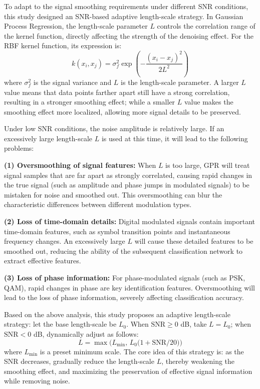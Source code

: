 \documentclass[conference]{IEEEtran}
\begin{document}
To adapt to the signal smoothing requirements under different SNR conditions, this study designed an SNR-based adaptive length-scale strategy. In Gaussian Process Regression, the length-scale parameter $L$ controls the correlation range of the kernel function, directly affecting the strength of the denoising effect. For the RBF kernel function, its expression is:
\begin{equation}
k(x_i, x_j) = \sigma_f^2 \exp\left(-\frac{(x_i - x_j)^2}{2L^2}\right)
\end{equation}
where $\sigma_f^2$ is the signal variance and $L$ is the length-scale parameter. A larger $L$ value means that data points farther apart still have a strong correlation, resulting in a stronger smoothing effect; while a smaller $L$ value makes the smoothing effect more localized, allowing more signal details to be preserved.

Under low SNR conditions, the noise amplitude is relatively large. If an excessively large length-scale $L$ is used at this time, it will lead to the following problems:

\textbf{(1) Oversmoothing of signal features:} When $L$ is too large, GPR will treat signal samples that are far apart as strongly correlated, causing rapid changes in the true signal (such as amplitude and phase jumps in modulated signals) to be mistaken for noise and smoothed out. This oversmoothing can blur the characteristic differences between different modulation types.

\textbf{(2) Loss of time-domain details:} Digital modulated signals contain important time-domain features, such as symbol transition points and instantaneous frequency changes. An excessively large $L$ will cause these detailed features to be smoothed out, reducing the ability of the subsequent classification network to extract effective features.

\textbf{(3) Loss of phase information:} For phase-modulated signals (such as PSK, QAM), rapid changes in phase are key identification features. Oversmoothing will lead to the loss of phase information, severely affecting classification accuracy.

Based on the above analysis, this study proposes an adaptive length-scale strategy: let the base length-scale be $L_0$. When $\mathrm{SNR}\ge0$ dB, take $L=L_0$; when $\mathrm{SNR}<0$ dB, dynamically adjust as follows:
\begin{equation}
L = \max\bigl(L_{\min},\,L_0\bigl(1+\mathrm{SNR}/20\bigr)\bigr)
\end{equation}
where $L_{\min}$ is a preset minimum scale. The core idea of this strategy is: as the SNR decreases, gradually reduce the length-scale $L$, thereby weakening the smoothing effect, and maximizing the preservation of effective signal information while removing noise.
\end{document}
